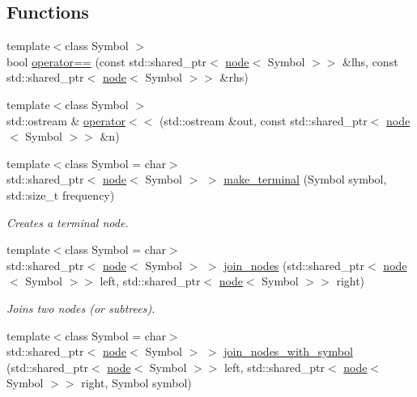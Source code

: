 \subsection*{Functions}
\begin{DoxyCompactItemize}
\item 
{\footnotesize template$<$class Symbol $>$ }\\bool \mbox{\hyperlink{namespaceirk_1_1coding_1_1huffman_a63e61bc94c39b2400e4cf422db2ececf}{operator==}} (const std\+::shared\+\_\+ptr$<$ \mbox{\hyperlink{structirk_1_1coding_1_1huffman_1_1node}{node}}$<$ Symbol $>$$>$ \&lhs, const std\+::shared\+\_\+ptr$<$ \mbox{\hyperlink{structirk_1_1coding_1_1huffman_1_1node}{node}}$<$ Symbol $>$$>$ \&rhs)
\item 
{\footnotesize template$<$class Symbol $>$ }\\std\+::ostream \& \mbox{\hyperlink{namespaceirk_1_1coding_1_1huffman_a84ac96d5053bc449a2a6b1b8a66aa9da}{operator$<$$<$}} (std\+::ostream \&out, const std\+::shared\+\_\+ptr$<$ \mbox{\hyperlink{structirk_1_1coding_1_1huffman_1_1node}{node}}$<$ Symbol $>$$>$ \&n)
\item 
{\footnotesize template$<$class Symbol  = char$>$ }\\std\+::shared\+\_\+ptr$<$ \mbox{\hyperlink{structirk_1_1coding_1_1huffman_1_1node}{node}}$<$ Symbol $>$ $>$ \mbox{\hyperlink{namespaceirk_1_1coding_1_1huffman_a02736685ec8f32576af06336b2ec9ed8}{make\+\_\+terminal}} (Symbol symbol, std\+::size\+\_\+t frequency)
\begin{DoxyCompactList}\small\item\em Creates a terminal node. \end{DoxyCompactList}\item 
{\footnotesize template$<$class Symbol  = char$>$ }\\std\+::shared\+\_\+ptr$<$ \mbox{\hyperlink{structirk_1_1coding_1_1huffman_1_1node}{node}}$<$ Symbol $>$ $>$ \mbox{\hyperlink{namespaceirk_1_1coding_1_1huffman_ac5ed25bf8ec1c076d2905f59e3930502}{join\+\_\+nodes}} (std\+::shared\+\_\+ptr$<$ \mbox{\hyperlink{structirk_1_1coding_1_1huffman_1_1node}{node}}$<$ Symbol $>$$>$ left, std\+::shared\+\_\+ptr$<$ \mbox{\hyperlink{structirk_1_1coding_1_1huffman_1_1node}{node}}$<$ Symbol $>$$>$ right)
\begin{DoxyCompactList}\small\item\em Joins two nodes (or subtrees). \end{DoxyCompactList}\item 
{\footnotesize template$<$class Symbol  = char$>$ }\\std\+::shared\+\_\+ptr$<$ \mbox{\hyperlink{structirk_1_1coding_1_1huffman_1_1node}{node}}$<$ Symbol $>$ $>$ \mbox{\hyperlink{namespaceirk_1_1coding_1_1huffman_a504575bbf01c932df8cf77ef6f5e9330}{join\+\_\+nodes\+\_\+with\+\_\+symbol}} (std\+::shared\+\_\+ptr$<$ \mbox{\hyperlink{structirk_1_1coding_1_1huffman_1_1node}{node}}$<$ Symbol $>$$>$ left, std\+::shared\+\_\+ptr$<$ \mbox{\hyperlink{structirk_1_1coding_1_1huffman_1_1node}{node}}$<$ Symbol $>$$>$ right, Symbol symbol)
$$
\end{DoxyCompactItemize}

